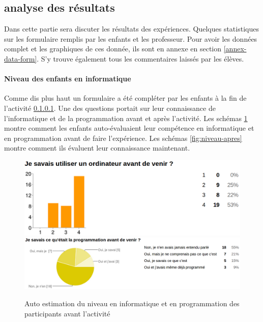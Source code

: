 \subsection{analyse des résultats}
Dans cette partie sera discuter les résultats des expériences. Quelques statistiques sur les formulaire remplis par les enfants et les professeur. Pour avoir les données complet et les graphiques de ces donnée, ils sont en annexe en section \ref{annex-data-form}. S'y trouve également tous les commentaires laissés par les élèves.

\paragraph{Niveau des enfants en informatique}
Comme dis plus haut un formulaire a été compléter par les enfants à la fin de l'activité \ref{}. Une des questions portait sur leur connaissance de l'informatique et de la programmation avant et après l'activité. Les schémas \ref{fig:niveau-avant} montre comment les enfants auto-évaluaient leur compétence en informatique et en programmation avant de faire l'expérience. Les schémas \ref{fig:niveau-apres} montre comment ils évaluent leur connaissance maintenant.
\begin{figure}[ht]
  \begin{center}
    \includegraphics[scale=0.3]{content/8-validation/images/avant}
    \includegraphics[scale=0.2]{content/8-validation/images/programmation}
    \caption{Auto estimation du niveau en informatique et en programmation des participants avant l'activité}
    \label{fig:niveau-avant}
  \end{center}
\end{figure}
